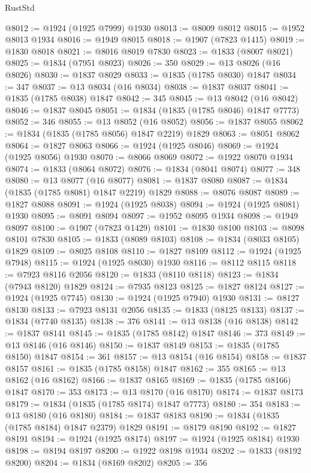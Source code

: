 \begin{lexlean}{RustStd}
\begin{coremodule}
@8012 := @1924 (@1925 @7999) @1930
@8013 := @8009 @8012
@8015 := @1952 @8013 @1934
@8016 := @1949 @8015
@8018 := @1907 (@7823 @1415)
@8019 := @1830 @8018
@8021 := @8016 @8019 @7830
@8023 := @1833 (@8007 @8021)
@8025 := @1834 (@7951 @8023)
@8026 := 350
@8029 := @13 @8026 (@16 @8026)
@8030 := @1837 @8029
@8033 := @1835 (@1785 @8030) @1847
@8034 := 347
@8037 := @13 @8034 (@16 @8034)
@8038 := @1837 @8037
@8041 := @1835 (@1785 @8038) @1847
@8042 := 345
@8045 := @13 @8042 (@16 @8042)
@8046 := @1837 @8045
@8051 := @1834 (@1835 (@1785 @8046) @1847 @7773)
@8052 := 346
@8055 := @13 @8052 (@16 @8052)
@8056 := @1837 @8055
@8062 := @1834 (@1835 (@1785 @8056) @1847 @2219) @1829
@8063 := @8051 @8062
@8064 := @1827 @8063
@8066 := @1924 (@1925 @8046)
@8069 := @1924 (@1925 @8056) @1930
@8070 := @8066 @8069
@8072 := @1922 @8070 @1934
@8074 := @1833 (@8064 @8072)
@8076 := @1834 (@8041 @8074)
@8077 := 348
@8080 := @13 @8077 (@16 @8077)
@8081 := @1837 @8080
@8087 := @1834 (@1835 (@1785 @8081) @1847 @2219) @1829
@8088 := @8076 @8087
@8089 := @1827 @8088
@8091 := @1924 (@1925 @8038)
@8094 := @1924 (@1925 @8081) @1930
@8095 := @8091 @8094
@8097 := @1952 @8095 @1934
@8098 := @1949 @8097
@8100 := @1907 (@7823 @1429)
@8101 := @1830 @8100
@8103 := @8098 @8101 @7830
@8105 := @1833 (@8089 @8103)
@8108 := @1834 (@8033 @8105) @1829
@8109 := @8025 @8108
@8110 := @1827 @8109
@8112 := @1924 (@1925 @7948)
@8115 := @1924 (@1925 @8030) @1930
@8116 := @8112 @8115
@8118 := @7923 @8116 @2056
@8120 := @1833 (@8110 @8118)
@8123 := @1834 (@7943 @8120) @1829
@8124 := @7935 @8123
@8125 := @1827 @8124
@8127 := @1924 (@1925 @7745)
@8130 := @1924 (@1925 @7940) @1930
@8131 := @8127 @8130
@8133 := @7923 @8131 @2056
@8135 := @1833 (@8125 @8133)
@8137 := @1834 (@7740 @8135)
@8138 := 376
@8141 := @13 @8138 (@16 @8138)
@8142 := @1837 @8141
@8145 := @1835 (@1785 @8142) @1847
@8146 := 373
@8149 := @13 @8146 (@16 @8146)
@8150 := @1837 @8149
@8153 := @1835 (@1785 @8150) @1847
@8154 := 361
@8157 := @13 @8154 (@16 @8154)
@8158 := @1837 @8157
@8161 := @1835 (@1785 @8158) @1847
@8162 := 355
@8165 := @13 @8162 (@16 @8162)
@8166 := @1837 @8165
@8169 := @1835 (@1785 @8166) @1847
@8170 := 353
@8173 := @13 @8170 (@16 @8170)
@8174 := @1837 @8173
@8179 := @1834 (@1835 (@1785 @8174) @1847 @7773)
@8180 := 354
@8183 := @13 @8180 (@16 @8180)
@8184 := @1837 @8183
@8190 := @1834 (@1835 (@1785 @8184) @1847 @2379) @1829
@8191 := @8179 @8190
@8192 := @1827 @8191
@8194 := @1924 (@1925 @8174)
@8197 := @1924 (@1925 @8184) @1930
@8198 := @8194 @8197
@8200 := @1922 @8198 @1934
@8202 := @1833 (@8192 @8200)
@8204 := @1834 (@8169 @8202)
@8205 := 356

\end{coremodule}
\end{lexlean}
